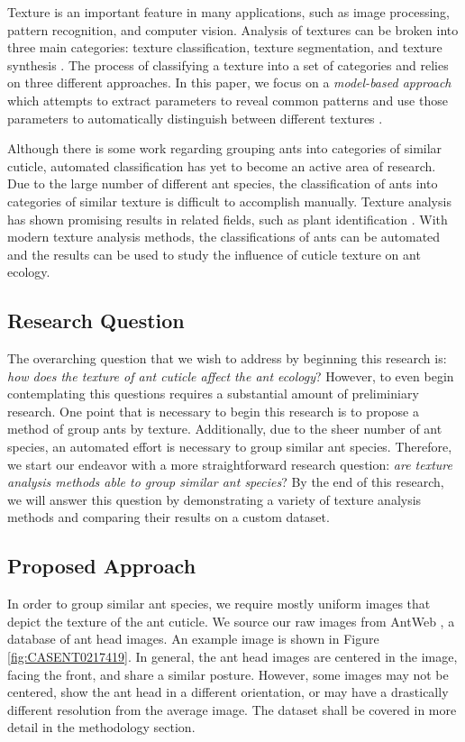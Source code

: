 \documentclass[12pt]{article}
\begin{document}
Texture is an important feature in many applications, such as image processing,
pattern recognition, and computer vision. Analysis of textures can be broken
into three main categories: texture classification, texture segmentation, and
texture synthesis \cite{reed_review_1993}. The process of classifying a texture
into a set of categories and relies on three different approaches. In this
paper, we focus on a \textit{model-based approach} which attempts to extract
parameters to reveal common patterns and use those parameters to automatically
distinguish between different textures \cite{maillard_texture_2003}.

Although there is some work regarding grouping ants into categories of similar
cuticle, automated classification has yet to become an active area of research.
Due to the large number of different ant species, the classification of ants
into categories of similar texture is difficult to accomplish manually. Texture
analysis has shown promising results in related fields, such as plant
identification \cite{boudra_plant_2018}. With modern texture analysis methods,
the classifications of ants can be automated and the results can be used to
study the influence of cuticle texture on ant ecology.

\subsection{Research Question}

The overarching question that we wish to address by beginning this research is:
\textit{how does the texture of ant cuticle affect the ant ecology}? However, to
even begin contemplating this questions requires a substantial amount of
preliminiary research. One point that is necessary to begin this research is to
propose a method of group ants by texture. Additionally, due to the sheer number
of ant species, an automated effort is necessary to group similar ant species.
Therefore, we start our endeavor with a more straightforward research question:
\textit{are texture analysis methods able to group similar ant species}? By the
end of this research, we will answer this question by demonstrating a variety of
texture analysis methods and comparing their results on a custom dataset.

\subsection{Proposed Approach}

In order to group similar ant species, we require mostly uniform images that
depict the texture of the ant cuticle. We source our raw images from AntWeb
\cite{perrichot_antweb_2012}, a database of ant head images. An example image is
shown in Figure \ref{fig:CASENT0217419}. In general, the ant head images are centered in
the image, facing the front, and share a similar posture. However, some images
may not be centered, show the ant head in a different orientation, or may have a
drastically different resolution from the average image. The dataset shall be
covered in more detail in the methodology section.
\end{document}
